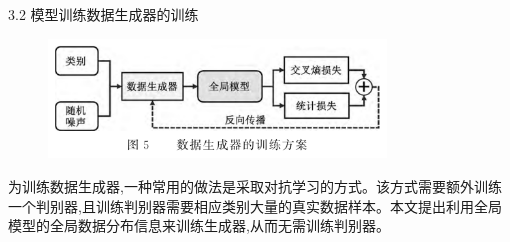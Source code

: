 \documentclass{sintefbeamer}
\theoremstyle{definition}
\begin{document}
\begin{frame}{3.2 模型训练}{数据生成器的训练}
\begin{figure}[ht]
\centering
\includegraphics[width=0.8\textwidth]{images/img_gan_train}
\end{figure}
为训练数据生成器,一种常用的做法是采取对抗学习的方式。该方式需要额外训练一个判别器,且训练判别器需要相应类别大量的真实数据样本。本文提出利用全局模型的全局数据分布信息来训练生成器,从而无需训练判别器。
\end{frame}
\end{document}
